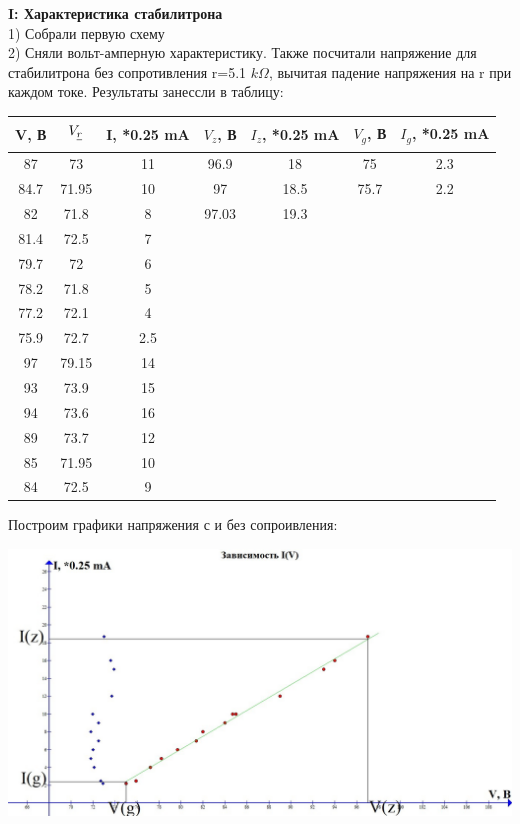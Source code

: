 \documentclass[a4paper,12pt]{article} %
\begin{document}
\textbf{I: Характеристика стабилитрона}\\
1) Собрали первую схему\\
2) Сняли вольт-амперную характеристику. Также посчитали напряжение для стабилитрона без сопротивления r=5.1 $k\Omega$, вычитая падение напряжения на r при каждом токе. Результаты занессли в таблицу: \\
\begin{tabular}{|c|c|c|c|c|c|c|}
\hline 
V, В & $V_{\sout{r}}$ & I, *0.25 mA & $V_z$, В & $I_z$, *0.25 mA & $V_g$, В & $I_g$, *0.25 mA     \\ 
\hline 
87 &  73& 11 & 96.9 & 18 & 75 & 2.3   \\ 
\hline 
84.7 & 71.95 & 10 & 97 & 18.5 & 75.7 & 2.2   \\ 
\hline 
82 & 71.8 &8 & 97.03 & 19.3 &  &    \\ 
\hline 
81.4 & 72.5 & 7 &  &  &  &    \\ 
\hline 
79.7 &  72& 6 &  &  &  &    \\ 
\hline 
78.2 & 71.8 & 5 &  &  &  &    \\ 
\hline 
77.2 & 72.1 & 4 &  &  &  &     \\ 
\hline 
75.9 & 72.7 & 2.5 &  &  &   &    \\ 
\hline 
97 & 79.15 & 14 &  &  &  &   \\ 
\hline 
93 & 73.9& 15 &  &  &  &     \\ 
\hline 
94 &  73.6& 16 &  &  &  &     \\ 
\hline 
89 & 73.7& 12 &  &  &  &     \\ 
\hline 
85 & 71.95  &10 &  &  &  &     \\ 
\hline 
84 & 72.5 & 9 &  &  &  &     \\ 
\hline 
\end{tabular} 

Построим графики напряжения с и без сопроивления:\\
\begin{center}

\includegraphics[scale=0.4]{3531} \\
\end{center}
\end{document}
